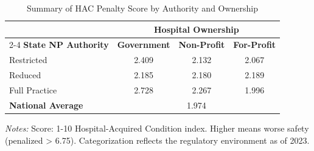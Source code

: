 \begin{table}[htbp]
    \centering
    \caption{Summary of HAC Penalty Score by Authority and Ownership}
    \label{tab:hac_total_score_own}
    \vspace{0.2cm}
    \begin{tabular}{lccc}
        \toprule
        & \multicolumn{3}{c}{\textbf{Hospital Ownership}} \\
        \cmidrule(lr){2-4}
        \textbf{State NP Authority} & \textbf{Government} & \textbf{Non-Profit} & \textbf{For-Profit} \\
        \midrule
        Restricted & 2.409 & 2.132 & 2.067 \\
        Reduced & 2.185 & 2.180 & 2.189 \\
        Full Practice & 2.728 & 2.267 & 1.996 \\
        \midrule
        \textbf{National Average} & \multicolumn{3}{c}{1.974} \\
        \bottomrule
    \end{tabular}
    \vspace{0.1cm}
    \begin{minipage}{0.85\textwidth}
        \footnotesize \textit{Notes:} Score: 1-10 Hospital-Acquired Condition index. Higher means worse safety (penalized > 6.75). Categorization reflects the regulatory environment as of 2023.
    \end{minipage}
\end{table}